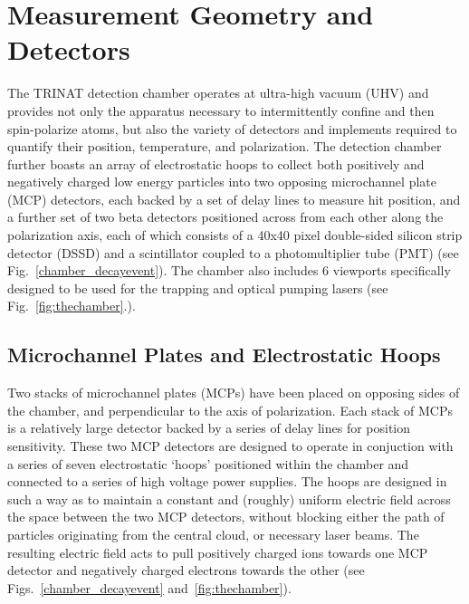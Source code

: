 \section{Measurement Geometry and Detectors}
\label{sec:geometry}


The TRINAT detection chamber operates at ultra-high vacuum (UHV) and provides not only the apparatus necessary to intermittently confine and then spin-polarize atoms, but also the variety of detectors and implements required to quantify their position, temperature, and polarization.  The detection chamber further boasts an array of electrostatic hoops to collect both positively and negatively charged low energy particles into two opposing microchannel plate (MCP) detectors, each backed by a set of delay lines to measure hit position, and a further set of two beta detectors positioned across from each other along the polarization axis, each of which consists of a 40x40 pixel double-sided silicon strip detector (DSSD) and a scintillator coupled to a photomultiplier tube (PMT) 
(see Fig.~\ref{chamber_decayevent}). The chamber also includes 6 viewports specifically designed to be used for the trapping and optical pumping lasers (see Fig.~\ref{fig:thechamber}.).

\subsection{Microchannel Plates and Electrostatic Hoops}
\label{section:mcps}
\label{section:field}
Two stacks of microchannel plates (MCPs) have been placed on opposing sides of the chamber, and perpendicular to the axis of polarization.  Each stack of MCPs is a relatively large detector backed by a series of delay lines for position sensitivity.  These two MCP detectors are designed to operate in conjuction with a series of seven electrostatic `hoops' positioned within the chamber and connected to a series of high voltage power supplies.  The hoops are designed in such a way as to maintain a constant and (roughly) uniform electric field across the space between the two MCP detectors, without blocking either the path of particles originating from the central cloud, or necessary laser beams.  The resulting electric field acts to pull positively charged ions towards one MCP detector and negatively charged electrons towards the other (see Figs.~\ref{chamber_decayevent} and~\ref{fig:thechamber}).  


